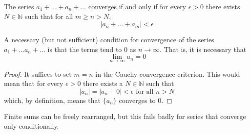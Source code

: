   \begin{theorem}
    \label{thm:cauchy-convergence-criterion-for-series}
    The series $a_1 + \ldots + a_n + \ldots$ converges if and only if for every $\epsilon > 0$ there exists $N \in \mathbb{N}$ such that for all $m \geq n > N$, 
    \begin{equation}
      |a_n + \ldots + a_m| < \epsilon
    \end{equation}
  \end{theorem}

  \begin{corollary}
    \label{thm:nth-term-test}
    A necessary (but not sufficient) condition for convergence of the series $a_1 + \ldots a_n + \ldots$ is that the terms tend to $0$ as $n \rightarrow \infty$. That is, it is necessary that
    \begin{equation}
      \lim_{n\rightarrow \infty} a_n = 0
    \end{equation}
  \end{corollary}
  \begin{proof}
    It suffices to set $m = n$ in the Cauchy convergence criterion. This would mean that for every $\epsilon > 0$ there exists a $N \in \mathbb{N}$ such that 
    \begin{equation}
      |a_n| = |a_n - 0| < \epsilon \text{ for all } n > N
    \end{equation}
    which, by definition, means that $\{a_n\}$ converges to $0$. 
  \end{proof}

  Finite sums can be freely rearranged, but this fails badly for series that converge only conditionally. 

